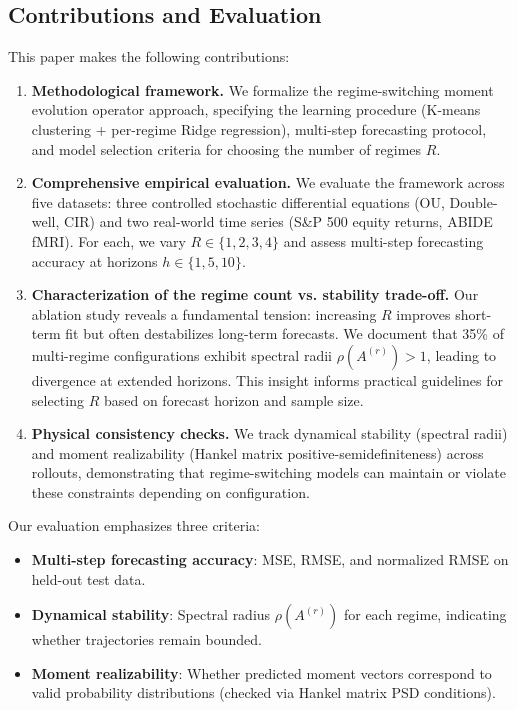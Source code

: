 \documentclass[journal, onecolumn]{IEEEtran}
\begin{document}
\subsection{Contributions and Evaluation}

This paper makes the following contributions:

\begin{enumerate}
    \item \textbf{Methodological framework.} We formalize the regime-switching moment evolution operator approach, specifying the learning procedure (K-means clustering + per-regime Ridge regression), multi-step forecasting protocol, and model selection criteria for choosing the number of regimes $R$.

    \item \textbf{Comprehensive empirical evaluation.} We evaluate the framework across five datasets: three controlled stochastic differential equations (OU, Double-well, CIR) and two real-world time series (S\&P 500 equity returns, ABIDE fMRI). For each, we vary $R \in \{1, 2, 3, 4\}$ and assess multi-step forecasting accuracy at horizons $h \in \{1, 5, 10\}$.

    \item \textbf{Characterization of the regime count vs. stability trade-off.} Our ablation study reveals a fundamental tension: increasing $R$ improves short-term fit but often destabilizes long-term forecasts. We document that 35\% of multi-regime configurations exhibit spectral radii $\rho(A^{(r)}) > 1$, leading to divergence at extended horizons. This insight informs practical guidelines for selecting $R$ based on forecast horizon and sample size.

    \item \textbf{Physical consistency checks.} We track dynamical stability (spectral radii) and moment realizability (Hankel matrix positive-semidefiniteness) across rollouts, demonstrating that regime-switching models can maintain or violate these constraints depending on configuration.
\end{enumerate}

Our evaluation emphasizes three criteria:
\begin{itemize}
    \item \textbf{Multi-step forecasting accuracy}: MSE, RMSE, and normalized RMSE on held-out test data.
    \item \textbf{Dynamical stability}: Spectral radius $\rho(A^{(r)})$ for each regime, indicating whether trajectories remain bounded.
    \item \textbf{Moment realizability}: Whether predicted moment vectors correspond to valid probability distributions (checked via Hankel matrix PSD conditions).
\end{itemize}
\end{document}

